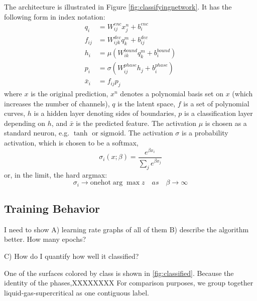 \documentclass[]{article}
\begin{document}
The architecture is illustrated in Figure \ref{fig:classifyingnetwork}.
It has the following form in index notation:
\begin{align}
  q_i &= W^{enc}_{ij} x^n_j + b^{enc}_i\\
  f_{ij} &= W^{dec}_{ijk} q^m_k + b^{dec}_{ij} \\
  h_i &= \mu\left(W^{bound}_{ik}q^m_k+b^{bound}_{i}\right) \\
  p_i &= \sigma\left(W^{phase}_{ij}h_j+b^{phase}_i\right) \\
  \bar{x}_i&= f_{ij} p_j
\end{align}
where $x$ is the original prediction, $x^n$ denotes a polynomial basis
set on $x$ (which increases the number of channels), $q$ is the latent
space, $f$ is a set of polynomial curves, $h$ is a hidden layer
denoting sides of boundaries, $p$ is a classification layer depending
on $h$, and $\bar{x}$ is the predicted feature. The activation $\mu$
is chosen as a standard neuron, e.g. $\tanh$ or $\text{sigmoid}$. The
activation $\sigma$ is a probability activation, which is chosen to be
a softmax,
\begin{equation}
\sigma_i(x;\beta) = \frac{e^{\beta x_i}}{\sum_j e^{\beta x_j}}
\end{equation}
or, in the limit, the hard argmax:
\begin{equation}
\sigma_i \rightarrow \text{onehot}\arg\max z \quad as\quad  \beta\rightarrow\infty
\end{equation}



\subsection{Training Behavior}

I need to show A) learning rate graphs of all of them
B) describe the algorithm better. How many epochs?

C) How do I quantify how well it classified?

One of the surfaces colored by class is shown in
\ref{fig:classified}. 
Because the identity of the phases,XXXXXXXX
For comparison purposes, we group together liquid-gas-supercritical as one contiguous label.
\end{document}
